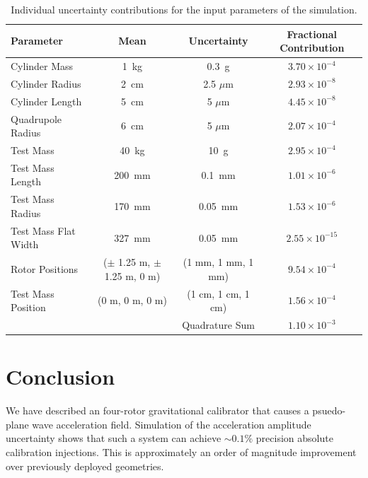 \documentclass[superscriptaddress, twocolumn, prd]{revtex4-1}
\begin{document}
\begin{widetext}
\begingroup
\setlength{\tabcolsep}{10pt} %
\renewcommand{\arraystretch}{1.5} %

\begin{table}[h!]
\begin{center}
\begin{tabular}{ |l|c|c|c| }
\hline
 Parameter & Mean & Uncertainty & Fractional Contribution\\
 \hline
Cylinder Mass & 1~kg & 0.3~g & $3.70\times10^{-4}$\\
Cylinder Radius & 2~cm & 2.5 $\mu$m & $2.93\times10^{-8}$\\
Cylinder Length & 5~cm & 5 $\mu$m & $4.45\times10^{-8}$\\
Quadrupole Radius & 6~cm & 5 $\mu$m &$2.07\times10^{-4}$\\
Test Mass & 40~kg & 10~g & $2.95\times10^{-4}$\\
Test Mass Length & 200~mm & 0.1~mm& $1.01\times10^{-6}$\\
Test Mass Radius & 170~mm & 0.05~mm& $1.53\times10^{-6}$\\
Test Mass Flat Width & 327~mm & 0.05~mm&$2.55\times10^{-15}$\\
Rotor Positions & ($\pm$ 1.25 m, $\pm$ 1.25 m, 0 m) & (1 mm, 1 mm, 1 mm) &$9.54\times10^{-4}$\\
Test Mass Position & (0 m, 0 m, 0 m) & (1 cm, 1 cm, 1 cm) &$1.56\times10^{-4}$\\
 \hline
 \hline
& &Quadrature Sum  &$1.10\times10^{-3}$\\
\hline
 \end{tabular}
 \caption{Individual uncertainty contributions for the input parameters of the simulation.}\label{uncert}
 \end{center}

\end{table}
\endgroup
\end{widetext}

\section{Conclusion}
 
\quad We have described an four-rotor gravitational calibrator that causes a psuedo-plane wave acceleration field. Simulation of the acceleration amplitude uncertainty shows that such a system can achieve $\sim0.1\%$ precision absolute calibration injections. This is approximately an order of magnitude improvement over previously deployed geometries.\cite{ncal} 
\end{document}
